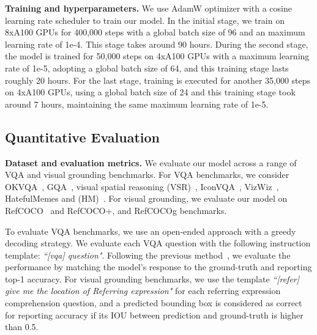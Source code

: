 \textbf{Training and hyperparameters.} We use AdamW optimizer with a cosine learning rate scheduler to train our model.  In the initial stage, we train on 8xA100 GPUs for 400,000 steps with a global batch size of 96 and an maximum learning rate of 1e-4. This stage takes around 90 hours. During the second stage, the model is trained for 50,000 steps on 4xA100 GPUs with a maximum learning rate of 1e-5, adopting a global batch size of 64, and this training stage lasts roughly 20 hours. For the last stage, training is executed for another 35,000 steps on 4xA100 GPUs, using a global batch size of 24 and this training stage took around 7 hours, maintaining the same maximum learning rate of 1e-5.














\subsection{Quantitative Evaluation}

\noindent \textbf{Dataset and evaluation metrics.} We  evaluate our model across a range of VQA and visual grounding benchmarks. For VQA benchmarks, we consider OKVQA~\citep{schwenk2022okvqa}, GQA~\citep{hudson2019gqa}, visual spatial reasoning (VSR)~\citep{liu2023visual}, IconVQA~\citep{iconqa}, VizWiz~\citep{vizwiz}, HatefulMemes and (HM)~\citep{hateful}. For visual grounding, we evaluate our model on  RefCOCO~\citep{kazemzadeh2014referitgame} and RefCOCO+\citep{yu2016modeling}, and RefCOCOg\citep{mao2016generation} benchmarks. 



To evaluate VQA benchmarks, we use an open-ended approach with a greedy decoding strategy. We evaluate each VQA question with the following instruction template: \textit{``[vqa] {question}"}. Following the previous  method~\citep{instructblip}, we evaluate the performance by matching the model's response to the ground-truth and reporting top-1 accuracy. For visual grounding benchmarks, we use the template \textit{``[refer] give me the location of {Referring expression}"} for each referring expression comprehension question, and a predicted bounding box is considered as correct for reporting accuracy if its IOU between prediction and ground-truth is higher than 0.5.





